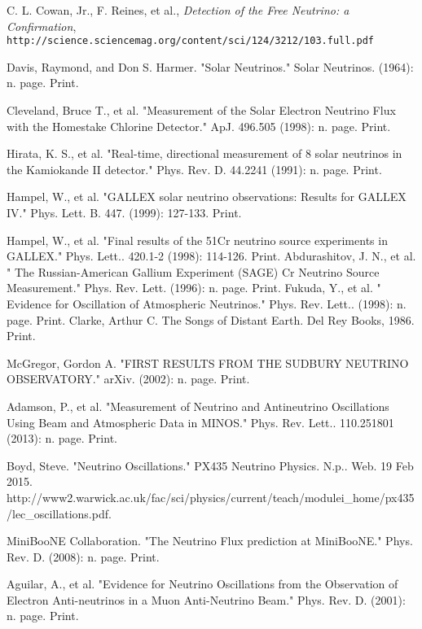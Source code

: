 \documentclass[12pt]{article}
\begin{document}
\newpage
\begin{thebibliography}{20} %
\singlespacing

  C. L. Cowan, Jr., F. Reines, et al., \emph{Detection of the Free Neutrino: a Confirmation}, \\
  \texttt{http://science.sciencemag.org/content/sci/124/3212/103.full.pdf}

Davis, Raymond, and Don S. Harmer. "Solar Neutrinos." Solar Neutrinos. (1964): n. page. Print.

Cleveland, Bruce T., et al. "Measurement of the Solar Electron Neutrino Flux with the Homestake Chlorine Detector." ApJ. 496.505 (1998): n. page. Print.

Hirata, K. S., et al. "Real-time, directional measurement of 8 solar neutrinos in the Kamiokande II detector." Phys. Rev. D. 44.2241 (1991): n. page. Print.

Hampel, W., et al. "GALLEX solar neutrino observations: Results for GALLEX IV." Phys. Lett. B. 447. (1999): 127-133. Print.

Hampel, W., et al. "Final results of the 51Cr neutrino source experiments in GALLEX." Phys. Lett.. 420.1-2 (1998): 114-126. Print.
Abdurashitov, J. N., et al. " The Russian-American Gallium Experiment (SAGE) Cr Neutrino Source Measurement."  Phys. Rev. Lett. (1996): n. page. Print.
Fukuda, Y., et al. " Evidence for Oscillation of Atmospheric Neutrinos."  Phys. Rev. Lett.. (1998): n. page. Print.
Clarke, Arthur C. The Songs of Distant Earth. Del Rey Books, 1986. Print.

McGregor, Gordon A. "FIRST RESULTS FROM THE SUDBURY NEUTRINO OBSERVATORY." arXiv. (2002): n. page. Print.

Adamson, P., et al. "Measurement of Neutrino and Antineutrino Oscillations Using Beam and Atmospheric Data in MINOS."  Phys. Rev. Lett.. 110.251801 (2013): n. page. Print.

Boyd, Steve. "Neutrino Oscillations." PX435 Neutrino Physics. N.p.. Web. 19 Feb 2015. http://www2.warwick.ac.uk/fac/sci/physics/current/teach/modulei\_home/px435/lec\_oscillations.pdf.

MiniBooNE Collaboration. "The Neutrino Flux prediction at MiniBooNE." Phys. Rev. D. (2008): n. page. Print.

Aguilar, A., et al. "Evidence for Neutrino Oscillations from the Observation of Electron Anti-neutrinos in a Muon Anti-Neutrino Beam." Phys. Rev. D. (2001): n. page. Print.


\end{thebibliography}
\end{document}

